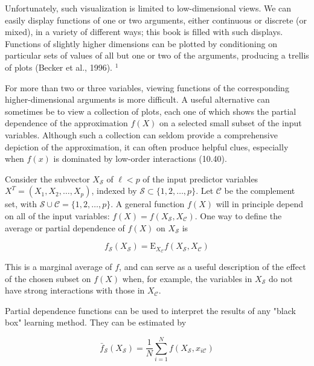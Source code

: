 \documentclass[10pt]{article}
\begin{document}
Unfortunately, such visualization is limited to low-dimensional views. We can easily display functions of one or two arguments, either continuous or discrete (or mixed), in a variety of different ways; this book is filled with such displays. Functions of slightly higher dimensions can be plotted by conditioning on particular sets of values of all but one or two of the arguments, producing a trellis of plots (Becker et al., 1996). ${ }^{1}$

For more than two or three variables, viewing functions of the corresponding higher-dimensional arguments is more difficult. A useful alternative can sometimes be to view a collection of plots, each one of which shows the partial dependence of the approximation $f(X)$ on a selected small subset of the input variables. Although such a collection can seldom provide a comprehensive depiction of the approximation, it can often produce helpful clues, especially when $f(x)$ is dominated by low-order interactions (10.40).

Consider the subvector $X_{\mathcal{S}}$ of $\ell<p$ of the input predictor variables $X^{T}= \left(X_{1}, X_{2}, \ldots, X_{p}\right)$, indexed by $\mathcal{S} \subset\{1,2, \ldots, p\}$. Let $\mathcal{C}$ be the complement set, with $\mathcal{S} \cup \mathcal{C}=\{1,2, \ldots, p\}$. A general function $f(X)$ will in principle depend on all of the input variables: $f(X)=f\left(X_{\mathcal{S}}, X_{\mathcal{C}}\right)$. One way to define the average or partial dependence of $f(X)$ on $X_{\mathcal{S}}$ is


\begin{equation*}
f_{\mathcal{S}}\left(X_{\mathcal{S}}\right)=\mathrm{E}_{X_{\mathcal{C}}} f\left(X_{\mathcal{S}}, X_{\mathcal{C}}\right) \tag{10.47}
\end{equation*}


This is a marginal average of $f$, and can serve as a useful description of the effect of the chosen subset on $f(X)$ when, for example, the variables in $X_{\mathcal{S}}$ do not have strong interactions with those in $X_{\mathcal{C}}$.

Partial dependence functions can be used to interpret the results of any "black box" learning method. They can be estimated by


\begin{equation*}
\bar{f}_{\mathcal{S}}\left(X_{\mathcal{S}}\right)=\frac{1}{N} \sum_{i=1}^{N} f\left(X_{\mathcal{S}}, x_{i \mathcal{C}}\right) \tag{10.48}
\end{equation*}
\end{document}
